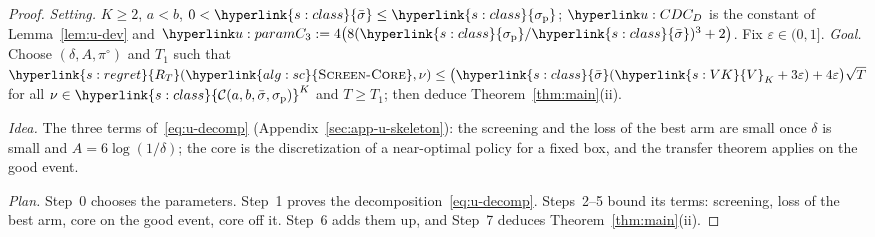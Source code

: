 \documentclass[11pt]{article}
\newcommand{\dt}[1]{\hypertarget{#1}{}}
\DeclareRobustCommand{\sy}[2]{{\hyperlink{#1}{#2}}}
\newcommand{\1}{\mathbf{1}}
\newcommand{\RT}{\sy{s:regret}{R_T}}
\newcommand{\Cab}{\sy{s:class}{\mathcal C(a,b,\bar\sigma,\sigma_{\mathrm p})}}
\newcommand{\sbar}{\sy{s:class}{\bar\sigma}}
\newcommand{\sigp}{\sy{s:class}{\sigma_{\mathrm p}}}
\newcommand{\VK}{\sy{s:VK}{V}}
\newcommand{\SC}{\sy{alg:sc}{\textsc{Screen-Core}}}
\begin{document}
\begin{proof}
\textit{Setting.}\dt{u:param} $K\ge2$, $a<b$, $0<\sbar\le\sigp$; $\uCD$ is the constant of Lemma~\ref{lem:u-dev} and $\uCt:=4\big(8(\sigp/\sbar)^3+2\big)$. Fix
$\varepsilon\in(0,1]$.
\textit{Goal.} Choose $(\delta,A,\pi^\circ)$ and $T_1$ such that $\RT(\SC,\nu)\le\big(\sbar(\VK_K+3\varepsilon)+4\varepsilon\big)\sqrt T$ for all $\nu\in\Cab^K$ and
$T\ge T_1$; then deduce Theorem~\ref{thm:main}(ii).

\textit{Idea.} The three terms of~\eqref{eq:u-decomp} (Appendix~\ref{sec:app-u-skeleton}): the screening and the loss of the best arm are small once $\delta$ is small
and $A=6\log(1/\delta)$; the core is the discretization of a near-optimal policy for a fixed box, and the transfer theorem applies on the good event.

\textit{Plan.} Step~0 chooses the parameters. Step~1 proves the decomposition~\eqref{eq:u-decomp}. Steps~2--5 bound its terms: screening, loss of the best arm,
core on the good event, core off it. Step~6 adds them up, and Step~7 deduces Theorem~\ref{thm:main}(ii).


\end{proof}
\end{document}
